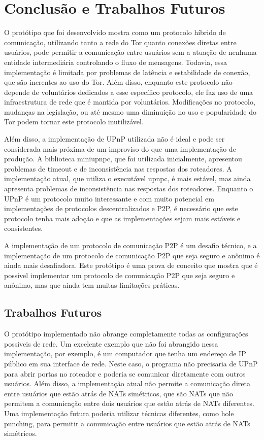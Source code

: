 \chapter{Conclusão e Trabalhos Futuros}

O protótipo que foi desenvolvido mostra como um protocolo híbrido de comunicação, utilizando tanto a rede do Tor quanto conexões diretas entre usuários, pode permitir a comunicação entre usuários sem a atuação de nenhuma entidade intermediária controlando o fluxo de mensagens. Todavia, essa implementação é limitada por problemas de latência e estabilidade de conexão, que são inerentes ao uso do Tor. Além disso, enquanto este protocolo não depende de voluntários dedicados a esse específico protocolo, ele faz uso de uma infraestrutura de rede que é mantida por voluntários. Modificações no protocolo, mudanças na legislação, ou até mesmo uma diminuição no uso e popularidade do Tor podem tornar este protocolo inutilizável.

Além disso, a implementação de UPnP utilizada não é ideal e pode ser considerada mais próxima de um improviso do que uma implementação de produção. A biblioteca miniupnpc, que foi utilizada inicialmente, apresentou problemas de timeout e de inconsistência nas respostas dos roteadores. A implementação atual, que utiliza o executável upnpc, é mais estável, mas ainda apresenta problemas de inconsistência nas respostas dos roteadores. Enquanto o UPnP é um protocolo muito interessante e com muito potencial em implementações de protocolos descentralizados e P2P, é necessário que este protocolo tenha mais adoção e que as implementações sejam mais estáveis e consistentes.

A implementação de um protocolo de comunicação P2P é um desafio técnico, e a implementação de um protocolo de comunicação P2P que seja seguro e anônimo é ainda mais desafiadora. Este protótipo é uma prova de conceito que mostra que é possível implementar um protocolo de comunicação P2P que seja seguro e anônimo, mas que ainda tem muitas limitações práticas.

\section{Trabalhos Futuros}

O protótipo implementado não abrange completamente todas as configurações possíveis de rede. Um excelente exemplo que não foi abrangido nessa implementação, por exemplo, é um computador que tenha um endereço de IP público em sua interface de rede. Neste caso, o programa não precisaria de UPnP para abrir portas no roteador e poderia se comunicar diretamente com outros usuários. Além disso, a implementação atual não permite a comunicação direta entre usuários que estão atrás de NATs simétricos, que são NATs que não permitem a comunicação entre dois usuários que estão atrás de NATs diferentes. Uma implementação futura poderia utilizar técnicas diferentes, como hole punching, para permitir a comunicação entre usuários que estão atrás de NATs simétricos.

